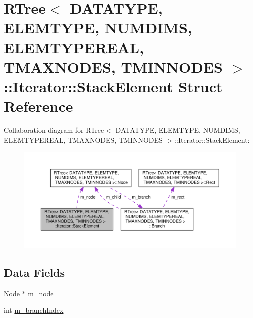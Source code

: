 \hypertarget{structRTree_1_1Iterator_1_1StackElement}{\section{R\-Tree$<$ D\-A\-T\-A\-T\-Y\-P\-E, E\-L\-E\-M\-T\-Y\-P\-E, N\-U\-M\-D\-I\-M\-S, E\-L\-E\-M\-T\-Y\-P\-E\-R\-E\-A\-L, T\-M\-A\-X\-N\-O\-D\-E\-S, T\-M\-I\-N\-N\-O\-D\-E\-S $>$\-:\-:Iterator\-:\-:Stack\-Element Struct Reference}
\label{structRTree_1_1Iterator_1_1StackElement}
}


Collaboration diagram for R\-Tree$<$ D\-A\-T\-A\-T\-Y\-P\-E, E\-L\-E\-M\-T\-Y\-P\-E, N\-U\-M\-D\-I\-M\-S, E\-L\-E\-M\-T\-Y\-P\-E\-R\-E\-A\-L, T\-M\-A\-X\-N\-O\-D\-E\-S, T\-M\-I\-N\-N\-O\-D\-E\-S $>$\-:\-:Iterator\-:\-:Stack\-Element\-:\nopagebreak
\begin{figure}[H]
\begin{center}
\leavevmode
\includegraphics[width=350pt]{structRTree_1_1Iterator_1_1StackElement__coll__graph}
\end{center}
\end{figure}
\subsection*{Data Fields}
\begin{DoxyCompactItemize}
\item 
\hyperlink{structRTree_1_1Node}{Node} $\ast$ \hyperlink{structRTree_1_1Iterator_1_1StackElement_a915f96106d5c78e14209c4d5e83ee756}{m\-\_\-node}
\item 
int \hyperlink{structRTree_1_1Iterator_1_1StackElement_a2101e49f2ac3911fa909a1779485d8f4}{m\-\_\-branch\-Index}
\end{DoxyCompactItemize}


